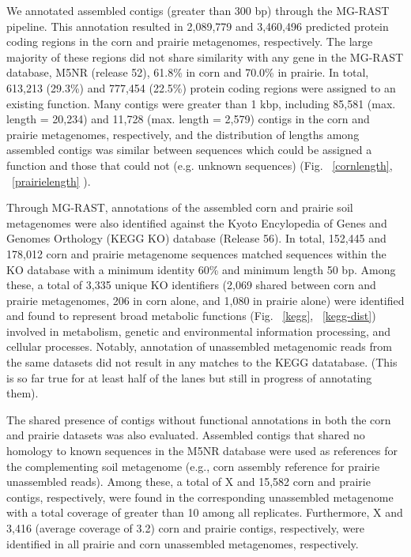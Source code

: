 \documentclass{pnastwo}
\begin{document}
\begin{article}
We annotated assembled contigs (greater than 300 bp) through the MG-RAST
pipeline. This annotation resulted in 2,089,779 and 3,460,496 predicted protein
coding regions in the corn and prairie metagenomes, respectively. The large
majority of these regions did not share similarity with any gene in the MG-RAST
database, M5NR (release 52), 61.8\% in corn and 70.0\% in prairie. In total,
613,213 (29.3\%) and 777,454 (22.5\%) protein coding regions were assigned to an
existing function. Many contigs were greater than 1 kbp, including 85,581 (max.
length = 20,234) and 11,728 (max. length = 2,579) contigs in the corn and
prairie metagenomes, respectively, and the distribution of lengths among
assembled contigs was similar between sequences which could be assigned a
function and those that could not (e.g. unknown sequences) (Fig. ~\ref{cornlength}, ~\ref{prairielength}
).

Through MG-RAST, annotations of the assembled corn and prairie soil metagenomes
were also identified against the Kyoto Encylopedia of Genes and Genomes
Orthology (KEGG KO) database (Release 56). In total, 152,445 and 178,012 corn
and prairie metagenome sequences matched sequences within the KO database with a
minimum identity 60\% and minimum length 50 bp. Among these, a total of 3,335
unique KO identifiers (2,069 shared between corn and prairie metagenomes, 206 in
corn alone, and 1,080 in prairie alone) were identified and found to represent
broad metabolic functions (Fig. ~\ref{kegg}, ~\ref{kegg-dist}) involved in
metabolism, genetic and environmental information processing, and cellular
processes. Notably, annotation of unassembled metagenomic reads from the same
datasets did not result in any matches to the KEGG datatabase. (This is so far
true for at least half of the lanes but still in progress of annotating them).

The shared presence of contigs without functional annotations in both the corn
and prairie datasets was also evaluated. Assembled contigs that shared no
homology to known sequences in the M5NR database were used as references for the
complementing soil metagenome (e.g., corn assembly reference for prairie
unassembled reads). Among these, a total of X and 15,582 corn and prairie
contigs, respectively, were found in the corresponding unassembled metagenome
with a total coverage of greater than 10 among all replicates. Furthermore, X
and 3,416 (average coverage of 3.2) corn and prairie contigs, respectively, were
identified in all prairie and corn unassembled metagenomes, respectively.


\end{article}
\end{document}
